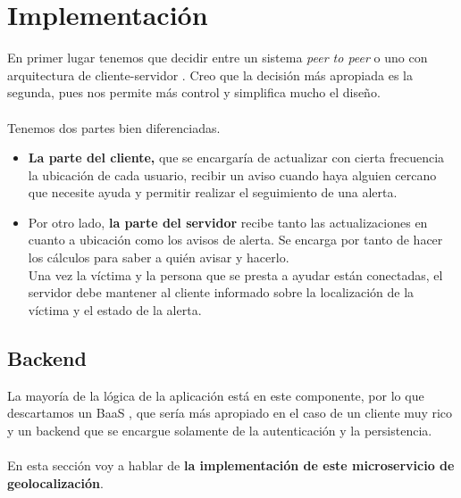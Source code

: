 \chapter{Implementación}
En primer lugar tenemos que decidir entre un sistema \textit{peer to peer} \cite{p2p} o uno con arquitectura de cliente-servidor \cite{client-server}.
Creo que la decisión más apropiada es la segunda, pues nos permite más control y simplifica mucho el diseño. \\\\
Tenemos dos partes bien diferenciadas.
\begin{itemize}
	\item  \textbf{La parte del cliente,} que se encargaría de actualizar con cierta frecuencia
la ubicación de cada usuario, recibir un aviso cuando haya alguien cercano que necesite ayuda y permitir realizar el seguimiento de una alerta.
\item Por otro lado, \textbf{la parte del servidor} recibe tanto las actualizaciones en cuanto a ubicación como 
los avisos de alerta. Se encarga por tanto de hacer los cálculos para saber a quién avisar y hacerlo. \\
Una vez la víctima y la persona que se presta a ayudar están conectadas, el servidor debe mantener
al cliente informado sobre la localización de la víctima y el estado de la alerta. \\
\end{itemize}

\section{Backend}
La mayoría de la lógica de la aplicación está en este componente, por lo que descartamos un BaaS \cite{baas}, que sería más apropiado en el caso de un cliente 
muy rico y un backend que se encargue solamente de la autenticación y la persistencia. \\ \\

En esta sección voy a hablar de \textbf{la implementación de este microservicio de geolocalización}.
